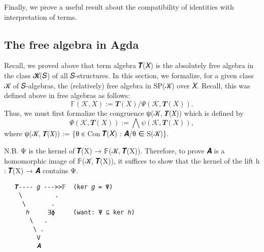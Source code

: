 \documentclass[a4paper,USenglish,cleveref,autoref,thm-restate]{lipics-v2019}
\begin{document}
Finally, we prove a useful result about the compatibility of identities with interpretation of terms.
\begin{code}\end{code}






















\subsection{The free algebra in Agda}\label{sec:the-free-algebra-in-agda}
Recall, we proved above that term algebra 𝑻(𝑋) is the absolutely free algebra in the class 𝓚(𝑆) of all 𝑆-structures. In this section, we formalize, for a given class 𝒦 of 𝑆-algebras, the (relatively) free algebra in SP(𝒦) over 𝑋. Recall, this was defined above in free algebras as follows:
\[𝔽(𝒦, 𝑋) := 𝑻(𝑋)/Ψ(𝒦, 𝑻(𝑋)).\]
Thus, we must first formalize the congruence ψ(𝒦, 𝑻(𝑋)) which is defined by
\[Ψ(𝒦, 𝑻(𝑋)) := ⋀ ψ(𝒦, 𝑻(𝑋)),\]
where ψ(𝒦, 𝑻(𝑋)) := \{θ ∈ Con 𝑻(𝑋) : 𝑨/θ ∈ S(𝒦)\}.
\begin{code}\end{code}

N.B. Ψ is the kernel of 𝑻(X) → 𝔽(𝒦, 𝑻(X)). Therefore, to prove 𝑨 is a homomorphic image of 𝔽(𝒦, 𝑻(X)), it suffices to show that the kernel of the lift h : 𝑻(X) → 𝑨 contains Ψ.

\begin{verbatim}
   𝑻---- 𝑔 --->>𝔽  (ker 𝑔 = Ψ)
    \         .
     \       .
      ℎ     ∃ϕ     (want: Ψ ⊆ ker ℎ)
       \   .
        \ .
         V
         𝑨
\end{verbatim}
\end{document}
